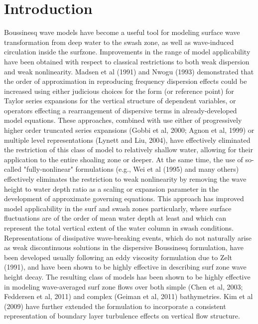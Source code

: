 \documentclass[11pt]{article}
\begin{document}
\newpage

\section{Introduction}

Boussinesq wave models  have become a useful tool  for modeling surface wave transformation from deep water  to the swash zone, as well as  wave-induced circulation inside the surfzone.  Improvements in the range of model applicability have been obtained with respect to classical restrictions to both weak dispersion and weak nonlinearity.  Madsen et al (1991) and Nwogu (1993) demonstrated that the order of approximation in reproducing frequency dispersion effects could be increased using either judicious choices for the form (or reference point) for Taylor series expansions for the vertical structure of dependent variables, or operators effecting a rearrangement of dispersive terms in already-developed model equations.  These approaches, combined with use either of progressively higher order truncated series expansions (Gobbi et al, 2000;  Agnon et al, 1999) or multiple level representations (Lynett and Liu, 2004), have effectively eliminated the restriction of this class of model to relatively shallow water, allowing for their application to the entire shoaling zone or deeper.  At the same time, the use of so-called "fully-nonlinear" formulations (e.g., Wei et al (1995) and many others) effectively eliminates the restriction to weak nonlinearity by removing the wave height to water depth ratio as a scaling or expansion parameter in the development of approximate governing equations.  This approach has improved model applicability in the surf and swash zones particularly, where surface fluctuations are of the order of mean water depth at least and which can represent the total vertical extent of the water column in swash conditions.  Representations of dissipative wave-breaking events, which do not naturally arise as weak discontinuous solutions in the dispersive Boussinesq formulation, have been developed usually following an eddy viscosity formulation due to Zelt (1991), and have been shown to be highly effective in describing surf zone wave height decay.  The resulting class of models has been shown to be highly effective in modeling wave-averaged surf zone flows over both simple (Chen et al, 2003; Feddersen et al, 2011) and complex (Geiman et al, 2011) bathymetries.  Kim et al (2009) have further extended the formulation to incorporate a consistent representation of boundary layer turbulence effects on vertical flow structure.
\end{document}

